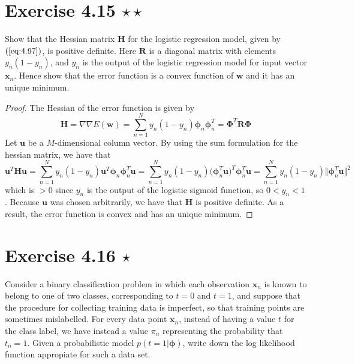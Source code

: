 \section*{Exercise 4.15 $\star \star$}
Show that the Hessian matrix $\mathbf{H}$ for the logistic regression
model, given by $(\ref{eq:4.97})$, is positive definite. Here $\mathbf{R}$
is a diagonal matrix with elements $y_n(1 - y_n)$, and $y_n$ is
the output of the logistic regression model for input vector $\mathbf{x}_n$.
Hence show that the error function is a convex function of $\mathbf{w}$
and it has an unique minimum.

\vspace{1em}

\begin{proof}
    The Hessian of the error function is given by
    \begin{equation}\label{eq:4.97}\tag{4.97}
        \mathbf{H} 
        = \nabla \nabla E(\mathbf{w})
        = \sum_{n=1}^{N} y_n(1 - y_n)\bm{\phi}_n\bm{\phi}_n^T
        = \mathbf{\Phi}^T\mathbf{R}\mathbf{\Phi}
    \end{equation}
    Let $\mathbf{u}$ be a $M$-dimensional column vector.
    By using the sum formulation for the hessian matrix, we have that
    \[
        \mathbf{u}^T\mathbf{H}\mathbf{u} 
        = \sum_{n=1}^{N} y_n(1 - y_n)\mathbf{u}^T\bm{\phi}_n\bm{\phi}_n^T\mathbf{u}
        = \sum_{n=1}^{N} y_n(1 - y_n) \big(\bm{\phi}_n^T\mathbf{u}\big)^T \bm{\phi}_n^T\mathbf{u}
        = \sum_{n=1}^{N} y_n(1 - y_n) \Vert\bm{\phi}_n^T \mathbf{u}\Vert^2
    \] 
    which is $>0$ since $y_n$ is the output of the logistic sigmoid function,
    so $0 < y_n < 1$. Because $\mathbf{u}$ was chosen arbitrarily, we have that
    $\mathbf{H}$ is positive definite. As a result, the error function is convex and has an unique
    minimum.
\end{proof}

\section*{Exercise 4.16 $\star$}
Consider a binary classification problem in which each observation
$\mathbf{x}_n$ is known to belong to one of two classes, corresponding to $t=0$
and $t=1$, and suppose that the procedure for collecting training data
is imperfect, so that training points are sometimes mislabelled. For
every data point $\mathbf{x}_n$, instead of having a value $t$ for
the class label, we have instead a value $\pi_n$ representing the
probability that $t_n = 1$. Given a probabilistic model $p(t = 1 | \bm{\phi})$,
write down the log likelihood function appropiate for such a data set.

